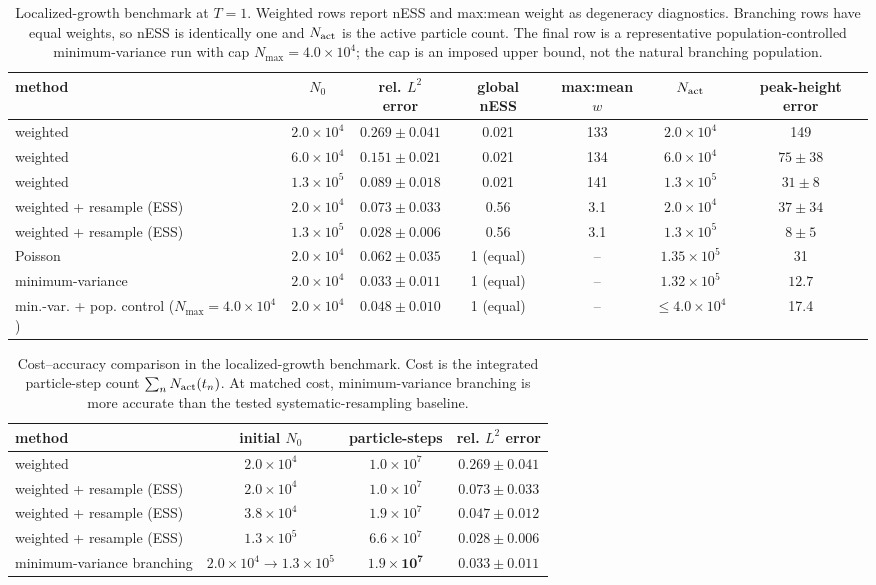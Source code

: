 \documentclass[a4paper,fleqn]{cas-sc}
\theoremstyle{definition}
\theoremstyle{remark}
\begin{document}
\begin{table}[t]
\centering
\caption{Localized-growth benchmark at $T=1$.  Weighted rows report nESS and max:mean weight as degeneracy diagnostics.  Branching rows have equal weights, so nESS is identically one and $N_{\rm act}$ is the active particle count.  The final row is a representative population-controlled minimum-variance run with cap $N_{\max}=4.0\times10^4$; the cap is an imposed upper bound, not the natural branching population.}
\label{tab:bw}
\begin{tabular}{l c c c c c c}
\toprule
method & $N_0$ & rel. $L^2$ error & global nESS & max:mean $w$ & $N_{\rm act}$ & peak-height error \\
\midrule
weighted & $2.0\times10^4$ & $0.269\pm0.041$ & 0.021 & 133 & $2.0\times10^4$ & 149 \\
weighted & $6.0\times10^4$ & $0.151\pm0.021$ & 0.021 & 134 & $6.0\times10^4$ & $75\pm38$ \\
weighted & $1.3\times10^5$ & $0.089\pm0.018$ & 0.021 & 141 & $1.3\times10^5$ & $31\pm8$ \\
weighted + resample (ESS) & $2.0\times10^4$ & $0.073\pm0.033$ & 0.56 & 3.1 & $2.0\times10^4$ & $37\pm34$ \\
weighted + resample (ESS) & $1.3\times10^5$ & $0.028\pm0.006$ & 0.56 & 3.1 & $1.3\times10^5$ & $8\pm5$ \\
Poisson & $2.0\times10^4$ & $0.062\pm0.035$ & 1 (equal) & -- & $1.35\times10^5$ & 31 \\
minimum-variance & $2.0\times10^4$ & $\mathbf{0.033\pm0.011}$ & 1 (equal) & -- & $1.32\times10^5$ & $\mathbf{12.7}$ \\
min.-var. + pop. control ($N_{\max}=4.0\times10^4$) & $2.0\times10^4$ & $0.048\pm0.010$ & 1 (equal) & -- & $\le 4.0\times10^4$ & 17.4 \\
\bottomrule
\end{tabular}
\end{table}

\begin{table}[t]
\centering
\caption{Cost--accuracy comparison in the localized-growth benchmark.  Cost is the integrated particle-step count $\sum_n N_{\rm act}(t_n)$.  At matched cost, minimum-variance branching is more accurate than the tested systematic-resampling baseline.}
\label{tab:bw_cost}
\begin{tabular}{l c c c}
\toprule
method & initial $N_0$ & particle-steps & rel. $L^2$ error \\
\midrule
weighted & $2.0\times10^4$ & $1.0\times10^7$ & $0.269\pm0.041$ \\
weighted + resample (ESS) & $2.0\times10^4$ & $1.0\times10^7$ & $0.073\pm0.033$ \\
weighted + resample (ESS) & $3.8\times10^4$ & $1.9\times10^7$ & $0.047\pm0.012$ \\
weighted + resample (ESS) & $1.3\times10^5$ & $6.6\times10^7$ & $0.028\pm0.006$ \\
minimum-variance branching & $2.0\times10^4\to1.3\times10^5$ & $\mathbf{1.9\times10^7}$ & $\mathbf{0.033\pm0.011}$ \\
\bottomrule
\end{tabular}
\end{table}
\end{document}
